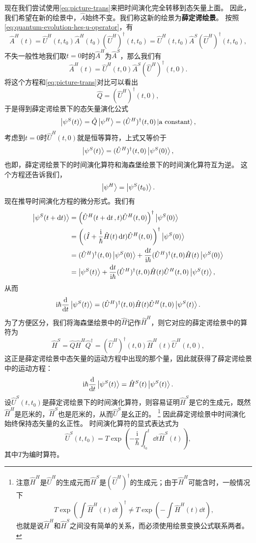\documentclass[hyperref, UTF8, a4paper]{ctexart}
\newcommand*{\ii}{\mathrm{i}}
\begin{document}
现在我们尝试使用\eqref{eq:picture-trans}来把时间演化完全转移到态矢量上面。
因此，我们希望在新的绘景中，$\hat{A}$始终不变。我们称这新的绘景为\textbf{薛定谔绘景}。
按照\eqref{eq:quantum-evolution-hes-u-operator}，有
\[
    \hat{A}^H(t) = \hat{U}^H(t, t_0) \hat{A}^H (t_0) (\hat{U}^H)^\dagger(t, t_0) = \hat{U}^H(t, t_0) \hat{A}^S( \hat{U}^H)^\dagger(t, t_0),
\]
不失一般性地我们取$t=0$时的$\hat{A}^H$为$\hat{A}^S$，那么我们有
\[
    \hat{A}^H (t) = \hat{U}^H(t, 0) \hat{A}^S( \hat{U}^H)^\dagger(t, 0).
\]
将这个方程和\eqref{eq:picture-trans}对比可以看出
\[
    \hat{Q} = (\hat{U}^H)^\dagger(t, 0),
\]
于是得到薛定谔绘景下的态矢量演化公式
\[
    \ket{\psi^S(t)} = \hat{Q} \ket{\psi^H} = (\hat{U}^H)^\dagger (t, 0) \ket{\text{a constant}},
\]
考虑到$t=0$时$\hat{U}^H (t, 0)$就是恒等算符，上式又等价于
\[
    \ket{\psi^S(t)} = (\hat{U}^H)^\dagger (t, 0) \ket{\psi^S (0)},
\]
也即，薛定谔绘景下的时间演化算符和海森堡绘景下的时间演化算符互为逆。
这个方程还告诉我们，
\[
    \ket{\psi^H} = \ket{\psi^S(t_0)}.
\]
现在推导时间演化方程的微分形式。我们有
\[
    \begin{aligned}
        \ket{\psi^S (t + \dd{t})} &= \left( \hat{U}^H (t + \dd{t}, t) \hat{U}^H (t, 0)  \right)^\dagger \ket{\psi^S(0)} \\
        &= \left( (\hat{I} + \frac{\ii}{\hbar} \hat{H}(t) \dd{t})   \hat{U}^H (t, 0) \right)^\dagger \ket{\psi^S (0)} \\
        &= (\hat{U}^H)^\dagger (t, 0) \ket{\psi^S (0)} + \frac{\dd{t}}{\ii \hbar} (\hat{U}^H)^\dagger (t, 0) \hat{H}(t) \ket{\psi^S (0)} \\
        &= \ket{\psi^S (t)} + \frac{\dd{t}}{\ii \hbar} (\hat{U}^H)^\dagger (t, 0) \hat{H}(t) \hat{U}^H (t, 0) \ket{\psi^S (t)},
    \end{aligned}
\]
从而
\[
    \ii \hbar \dv{t} \ket{\psi^S (t)} = (\hat{U}^H)^\dagger (t, 0) \hat{H}(t) \hat{U}^H (t, 0) \ket{\psi^S (t)}.
\]
为了方便区分，我们将海森堡绘景中的$\hat{H}$记作$\hat{H}^H$，则它对应的薛定谔绘景中的算符为
\[
    \hat{H}^S = \hat{Q} \hat{H}^H \hat{Q}^\dagger = (\hat{U}^H)^\dagger (t, 0) \hat{H}^H(t) \hat{U}^H (t, 0), 
\]
这正是薛定谔绘景中态矢量的运动方程中出现的那个量，因此就获得了薛定谔绘景中的运动方程：
\begin{equation}
    \ii \hbar \dv{t} \ket{\psi^S(t)} = \hat{H}^S (t) \ket{\psi^S(t)}.
\end{equation}
设$\hat{U}^S(t, t_0)$是薛定谔绘景下的时间演化算符，则容易证明$\hat{H}^S$是它的生成元，既然$\hat{H}^H$是厄米的，$\hat{H}^S$也是厄米的，从而$\hat{U}^S$是幺正的。%
\footnote{注意$\hat{H}^H$是$\hat{U}^H$的生成元而$\hat{H}^S$是$(\hat{U}^H)^\dagger$的生成元；由于$\hat{H}^H$可能含时，一般情况下
\[
    T \exp(\int \hat{H}^H (t) \dd{t})^\dagger \neq T \exp(- \int \hat{H}^H (t) \dd{t}),
\]
也就是说$\hat{H}^H$和$\hat{H}^S$之间没有简单的关系，而必须使用绘景变换公式联系两者。
}
因此薛定谔绘景中时间演化始终保持态矢量的幺正性。
时间演化算符的显式表达式为
\begin{equation}
    \hat{U}^S(t, t_0) = T \exp \left( - \frac{\ii}{\hbar} \int_{t_0}^t \dd{t} \hat{H}^S(t) \right),
\end{equation}
其中$T$为编时算符。
\end{document}
